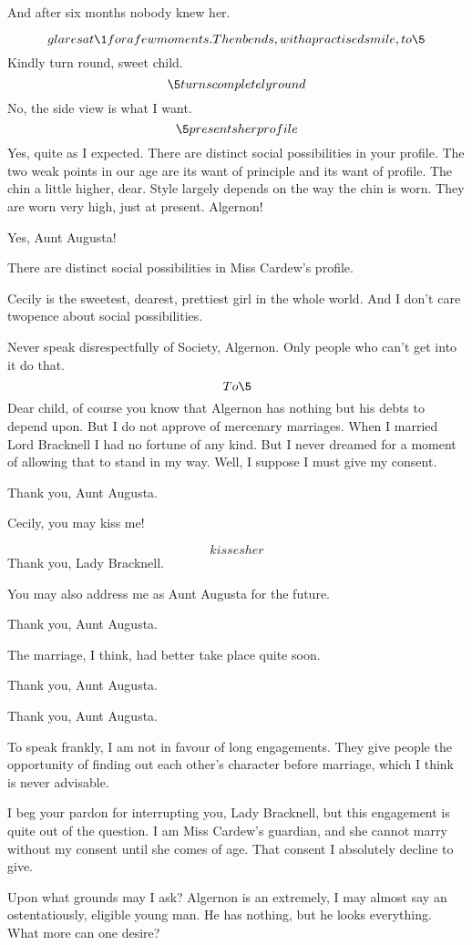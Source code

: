 \documentclass{book}
\begin{document}
\1  And after six months nobody knew her.

\3  \[glares at \1 for a few moments.  Then bends,
with a practised smile, to \5\]  Kindly turn round, sweet
child.  \[\5 turns completely round\]  No, the side view is what
I want.  \[\5 presents her profile\]  Yes, quite as I expected.
There are distinct social possibilities in your profile.  The two
weak points in our age are its want of principle and its want of
profile.  The chin a little higher, dear.  Style largely depends on
the way the chin is worn.  They are worn very high, just at
present.  Algernon!

\2  Yes, Aunt Augusta!

\3  There are distinct social possibilities in Miss
Cardew's profile.

\2  Cecily is the sweetest, dearest, prettiest girl in the
whole world.  And I don't care twopence about social possibilities.

\3  Never speak disrespectfully of Society, Algernon.
Only people who can't get into it do that.  \[To \5\]  Dear
child, of course you know that Algernon has nothing but his debts
to depend upon.  But I do not approve of mercenary marriages.  When
I married Lord Bracknell I had no fortune of any kind.  But I never
dreamed for a moment of allowing that to stand in my way.  Well, I
suppose I must give my consent.

\2  Thank you, Aunt Augusta.

\3  Cecily, you may kiss me!

\5  \[kisses her\]  Thank you, Lady Bracknell.

\3  You may also address me as Aunt Augusta for the
future.

\5  Thank you, Aunt Augusta.

\3  The marriage, I think, had better take place quite
soon.

\2  Thank you, Aunt Augusta.

\5  Thank you, Aunt Augusta.

\3  To speak frankly, I am not in favour of long
engagements.  They give people the opportunity of finding out each
other's character before marriage, which I think is never
advisable.

\1  I beg your pardon for interrupting you, Lady Bracknell, but
this engagement is quite out of the question.  I am Miss Cardew's
guardian, and she cannot marry without my consent until she comes
of age.  That consent I absolutely decline to give.

\3  Upon what grounds may I ask?  Algernon is an
extremely, I may almost say an ostentatiously, eligible young man.
He has nothing, but he looks everything.  What more can one desire?
\end{document}
